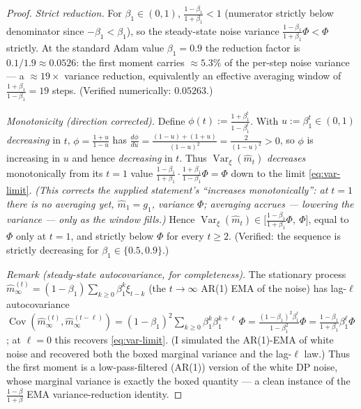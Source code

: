 \begin{proof}
\emph{Strict reduction.} For $\beta_1\in(0,1)$, $\tfrac{1-\beta_1}{1+\beta_1}<1$ (numerator strictly
below denominator since $-\beta_1<\beta_1$), so the steady-state noise variance
$\tfrac{1-\beta_1}{1+\beta_1}\Phi<\Phi$ strictly. At the standard Adam value $\beta_1=0.9$ the
reduction factor is $0.1/1.9\approx0.0526$: the first moment carries ${\approx}5.3\%$ of the per-step
noise variance --- a ${\approx}19\times$ variance reduction, equivalently an effective averaging
window of $\tfrac{1+\beta_1}{1-\beta_1}=19$ steps. (Verified numerically: $0.05263$.)

\emph{Monotonicity (direction corrected).} Define $\phi(t):=\tfrac{1+\beta_1^{t}}{1-\beta_1^{t}}$.
With $u:=\beta_1^{t}\in(0,1)$ \emph{decreasing} in $t$, $\phi=\tfrac{1+u}{1-u}$ has
$\tfrac{d\phi}{du}=\tfrac{(1-u)+(1+u)}{(1-u)^2}=\tfrac{2}{(1-u)^2}>0$, so $\phi$ is increasing in $u$
and hence \emph{decreasing} in $t$. Thus $\operatorname{Var}_\xi(\hat m_t)$ \emph{decreases}
monotonically from its $t=1$ value
$\tfrac{1-\beta_1}{1+\beta_1}\cdot\tfrac{1+\beta_1}{1-\beta_1}\Phi=\Phi$ down to the limit
\eqref{eq:var-limit}. \emph{(This corrects the supplied statement's ``increases monotonically'': at
$t=1$ there is no averaging yet, $\hat m_1=g_1$, variance $\Phi$; averaging accrues --- lowering the
variance --- only as the window fills.)} Hence
$\operatorname{Var}_\xi(\hat m_t)\in\big[\tfrac{1-\beta_1}{1+\beta_1}\Phi,\ \Phi\big]$, equal to $\Phi$
only at $t=1$, and strictly below $\Phi$ for every $t\ge2$. (Verified: the sequence is strictly
decreasing for $\beta_1\in\{0.5,0.9\}$.)

\emph{Remark (steady-state autocovariance, for completeness).} The stationary process
$\hat m_\infty^{(t)}=(1-\beta_1)\sum_{k\ge0}\beta_1^k\xi_{t-k}$ (the $t\to\infty$ AR(1) EMA of the
noise) has lag-$\ell$ autocovariance
$\operatorname{Cov}(\hat m_\infty^{(t)},\hat m_\infty^{(t-\ell)})
=(1-\beta_1)^2\sum_{k\ge0}\beta_1^{k}\beta_1^{k+\ell}\,\Phi
=\tfrac{(1-\beta_1)^2\beta_1^{\ell}}{1-\beta_1^2}\Phi
=\tfrac{1-\beta_1}{1+\beta_1}\beta_1^{\ell}\Phi$; at $\ell=0$ this recovers \eqref{eq:var-limit}. (I
simulated the AR(1)-EMA of white noise and recovered both the boxed marginal variance and the
lag-$\ell$ law.) Thus the first moment is a low-pass-filtered (AR(1)) version of the white DP noise,
whose marginal variance is exactly the boxed quantity --- a clean instance of the
$\tfrac{1-\beta}{1+\beta}$ EMA variance-reduction identity.


\end{proof}
